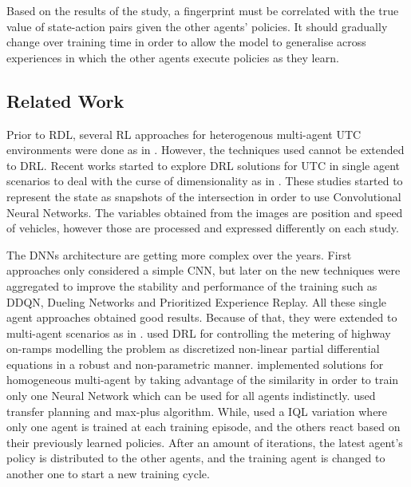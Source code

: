 \documentclass{llncs}
\begin{document}
Based on the results of the study, a fingerprint must be correlated with the true value of state-action pairs given the other agents' policies. It should gradually change over training time in order to allow the model to generalise across experiences in which the other agents execute policies as they learn.

\subsection{Related Work}

Prior to RDL, several RL approaches for heterogenous multi-agent UTC environments were done as in \cite{Dusparic2016,Chu2017,Tahifa2015,El-Tantawy2012}. However, the techniques used cannot be extended to DRL. Recent works started to explore DRL solutions for UTC in single agent scenarios to deal with the curse of dimensionality as in \cite{Li2016,Mousavi2017,Gao2017,Liang2018}. These studies started to represent the state as snapshots of the intersection in order to use Convolutional Neural Networks. The variables obtained from the images are position and speed of vehicles, however those are processed and expressed differently on each study.

The DNNs architecture are getting more complex over the years. First approaches only considered a simple CNN, but later on the new techniques were aggregated to improve the stability and performance of the training such as DDQN, Dueling Networks and Prioritized Experience Replay. All these single agent approaches obtained good results. Because of that, they were extended to multi-agent scenarios as in \cite{Belletti2018,VanDerPol2016,Liu2017CooperativeDR}. \cite{Belletti2018} used DRL for controlling the metering of highway on-ramps modelling the problem as discretized non-linear partial differential equations in a robust and non-parametric manner. \cite{VanDerPol2016,Liu2017CooperativeDR} implemented solutions for homogeneous multi-agent by taking advantage of the similarity in order to train only one Neural Network which can be used for all agents indistinctly. \cite{VanDerPol2016} used transfer planning and max-plus algorithm. While, \cite{Liu2017CooperativeDR} used a IQL variation where only one agent is trained at each training episode, and the others react based on their previously learned policies. After an amount of iterations, the latest agent's policy is distributed to the other agents, and the training agent is changed to another one to start a new training cycle. 
\end{document}
